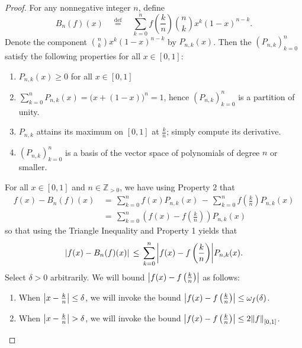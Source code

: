 \documentclass[11pt]{article}
\begin{document}
\begin{adjustwidth}{1cm}{}
  \begin{proof}
    For any nonnegative integer $n$, define
    \[
      B_{n}(f)(x) \quad \stackrel{\text{def}}{=} \quad  \sum\limits_{k = 0}^{n} f \left( \frac{k}{n} \right) \binom{n}{k} x^{k} (1 - x)^{n - k}.
    \]
    Denote the component $\binom{n}{k} x^{k} (1 - x)^{n - k}$ by $P_{n, k}(x)$. Then the $(P_{n, k})_{k = 0}^{n}$ satisfy the following properties for all $x \in [0, 1]$:
    \begin{enumerate}
      \item $P_{n, k}(x) \ge 0$ for all $x \in [0, 1]$
      \item $\sum\limits_{k = 0}^{n} P_{n, k}(x) = \big( x + (1 - x) \big)^{n} = 1$, hence $(P_{n, k})_{k = 0}^{n}$ is a partition of unity.
      \item $P_{n, k}$ attains its maximum on $[0, 1]$ at $\tfrac{k}{n}$; simply compute its derivative.
      \item $(P_{n, k})_{k = 0}^{n}$ is a basis of the vector space of polynomials of degree $n$ or smaller.
    \end{enumerate}
    For all $x \in [0, 1]$ and $n \in \mathbb{Z}_{> 0}$, we have using Property 2 that 
    \begin{align*}
      f(x) - B_{n}(f)(x) \, &= \, \sum\limits_{k = 0}^{n} f(x) P_{n, k}(x) \, - \, \sum\limits_{k = 0}^{n} f \left( \frac{k}{n} \right) P_{n, k}(x) \\
                            &= \, \sum\limits_{k = 0}^{n} \left( f(x) - f \left( \frac{k}{n} \right) \right) P_{n, k}(x)
    \end{align*}
    so that using the Triangle Inequality and Property 1 yields that
    \begin{equation}
      \abs{f(x) - B_{n}(f)(x)} \, \le \, \sum\limits_{k = 0}^{n} \abs{f(x) - f \left( \frac{k}{n} \right)}P_{n, k}(x).
    \end{equation}
    Select $\delta > 0$ arbitrarily. We will bound $\abs{f(x) - f \left( \tfrac{k}{n} \right)}$ as follows:
    \begin{enumerate}
      \item When $\abs{x - \tfrac{k}{n}} \le \delta$, we will invoke the bound $\abs{f(x) - f \left( \tfrac{k}{n} \right)} \le \omega_{f}(\delta)$.
      \item When $\abs{x - \tfrac{k}{n}} > \delta$, we will invoke the bound $\abs{f(x) - f \left( \tfrac{k}{n} \right)} \le 2 \norm{f}_{[0, 1]}$.
    \end{enumerate}

\end{proof}
\end{adjustwidth}
\end{document}

